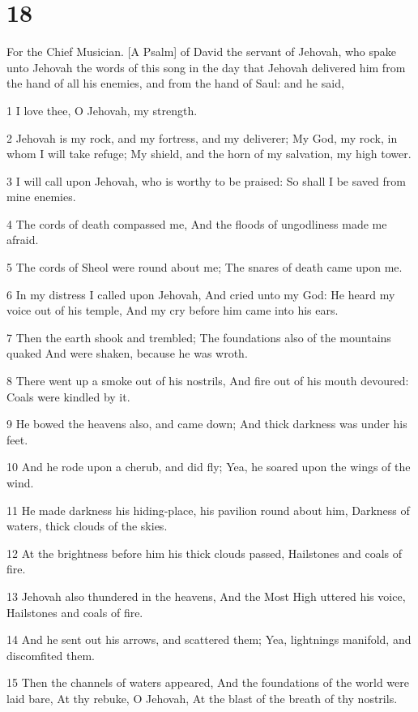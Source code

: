\chapter{18}

\par For the Chief Musician. [A Psalm] of David the servant of Jehovah, who spake unto Jehovah the words of this song in the day that Jehovah delivered him from the hand of all his enemies, and from the hand of Saul: and he said,

\par 1 I love thee, O Jehovah, my strength.
\par 2 Jehovah is my rock, and my fortress, and my deliverer; My God, my rock, in whom I will take refuge; My shield, and the horn of my salvation, my high tower.
\par 3 I will call upon Jehovah, who is worthy to be praised: So shall I be saved from mine enemies.
\par 4 The cords of death compassed me, And the floods of ungodliness made me afraid.
\par 5 The cords of Sheol were round about me; The snares of death came upon me.
\par 6 In my distress I called upon Jehovah, And cried unto my God: He heard my voice out of his temple, And my cry before him came into his ears.
\par 7 Then the earth shook and trembled; The foundations also of the mountains quaked And were shaken, because he was wroth.
\par 8 There went up a smoke out of his nostrils, And fire out of his mouth devoured: Coals were kindled by it.
\par 9 He bowed the heavens also, and came down; And thick darkness was under his feet.
\par 10 And he rode upon a cherub, and did fly; Yea, he soared upon the wings of the wind.
\par 11 He made darkness his hiding-place, his pavilion round about him, Darkness of waters, thick clouds of the skies.
\par 12 At the brightness before him his thick clouds passed, Hailstones and coals of fire.
\par 13 Jehovah also thundered in the heavens, And the Most High uttered his voice, Hailstones and coals of fire.
\par 14 And he sent out his arrows, and scattered them; Yea, lightnings manifold, and discomfited them.
\par 15 Then the channels of waters appeared, And the foundations of the world were laid bare, At thy rebuke, O Jehovah, At the blast of the breath of thy nostrils.
